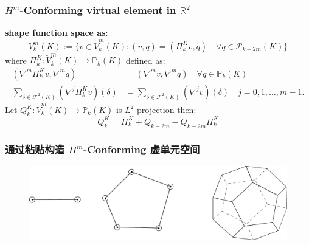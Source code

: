 \documentclass[notheorems,serif]{beamer}
\begin{document}
\begin{frame}
\frametitle{$H^m$-Conforming virtual element in $\mathbb{R}^2$}
    \textbf{shape function space as}:
    $$
    V_k^m(K) := \{v \in \widetilde{V}_k^m(K): (v, q) = (\Pi_k^Kv, q) \quad 
        \forall q \in \mathcal{P}_{k-2m}^{\perp}(K)\}
    $$
    where $\Pi_k^K : \widetilde{V}_k^m(K) \to \mathbb{P}_k(K)$ defined as:
    $$
    \begin{aligned}
        (\nabla^m \Pi_k^K v, \nabla^m q) &  = (\nabla^m v, \nabla^m q) \quad
        \forall q \in \mathbb{P}_k(K)\\
        \sum_{\delta\in\mathcal{F}^2(K)}(\nabla^j\Pi_k^K v)(\delta) & = 
        \sum_{\delta\in\mathcal{F}^2(K)}(\nabla^j v)(\delta) \quad j = 0, 1,
        \dots, m-1.
    \end{aligned}
    $$
    Let $Q_k^K : \widetilde{V}_k^m(K) \to \mathbb{P}_k(K)$ is $L^2$ projection
    then:
    $$
    Q_k^K = \Pi_k^K + Q_{k-2m} - Q_{k-2m}\Pi_k^K 
    $$
\end{frame}
\begin{frame}
    \frametitle{通过粘贴构造 $H^m$-Conforming 虚单元空间}
    \begin{figure}[H]
        \centering
        \includegraphics[scale=0.3]{../figures/bitmap.pdf}
    \end{figure}
\end{frame}
\end{document}
